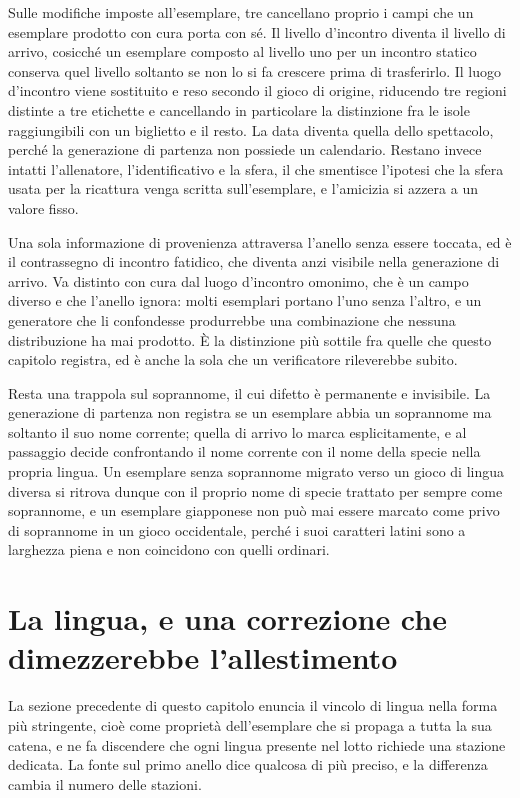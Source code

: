 Sulle modifiche imposte all'esemplare, tre cancellano proprio i campi che un esemplare prodotto con cura porta con sé. Il livello d'incontro diventa il livello di arrivo, cosicché un esemplare composto al livello uno per un incontro statico conserva quel livello soltanto se non lo si fa crescere prima di trasferirlo. Il luogo d'incontro viene sostituito e reso secondo il gioco di origine, riducendo tre regioni distinte a tre etichette e cancellando in particolare la distinzione fra le isole raggiungibili con un biglietto e il resto. La data diventa quella dello spettacolo, perché la generazione di partenza non possiede un calendario. Restano invece intatti l'allenatore, l'identificativo e la sfera, il che smentisce l'ipotesi che la sfera usata per la ricattura venga scritta sull'esemplare, e l'amicizia si azzera a un valore fisso.

Una sola informazione di provenienza attraversa l'anello senza essere toccata, ed è il contrassegno di incontro fatidico, che diventa anzi visibile nella generazione di arrivo. Va distinto con cura dal luogo d'incontro omonimo, che è un campo diverso e che l'anello ignora: molti esemplari portano l'uno senza l'altro, e un generatore che li confondesse produrrebbe una combinazione che nessuna distribuzione ha mai prodotto. È la distinzione più sottile fra quelle che questo capitolo registra, ed è anche la sola che un verificatore rileverebbe subito.

Resta una trappola sul soprannome, il cui difetto è permanente e invisibile. La generazione di partenza non registra se un esemplare abbia un soprannome ma soltanto il suo nome corrente; quella di arrivo lo marca esplicitamente, e al passaggio decide confrontando il nome corrente con il nome della specie nella propria lingua. Un esemplare senza soprannome migrato verso un gioco di lingua diversa si ritrova dunque con il proprio nome di specie trattato per sempre come soprannome, e un esemplare giapponese non può mai essere marcato come privo di soprannome in un gioco occidentale, perché i suoi caratteri latini sono a larghezza piena e non coincidono con quelli ordinari.

\section{La lingua, e una correzione che dimezzerebbe l'allestimento}

La sezione precedente di questo capitolo enuncia il vincolo di lingua nella forma più stringente, cioè come proprietà dell'esemplare che si propaga a tutta la sua catena, e ne fa discendere che ogni lingua presente nel lotto richiede una stazione dedicata. La fonte sul primo anello dice qualcosa di più preciso, e la differenza cambia il numero delle stazioni.

